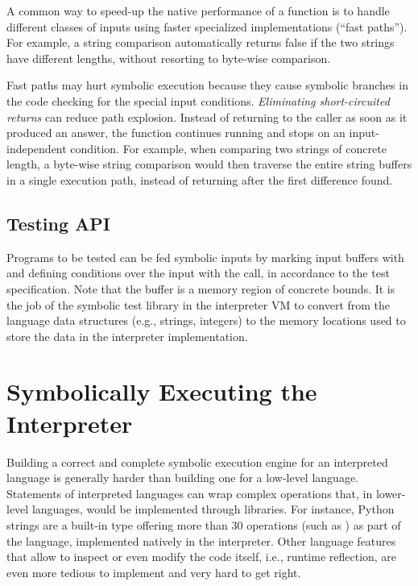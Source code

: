 A common way to speed-up the native performance of a function is to handle different classes of inputs using faster specialized implementations (``fast paths'').  For example, a string comparison automatically returns false if the two strings have different lengths, without resorting to byte-wise comparison.

Fast paths may hurt symbolic execution because they cause symbolic branches in the code checking for the special input conditions.  \emph{Eliminating short-circuited returns} can reduce path explosion.  Instead of returning to the caller as soon as it produced an answer, the function continues running and stops on an input-independent condition.  For example, when comparing two strings of concrete length, a byte-wise string comparison would then traverse the entire string buffers in a single execution path, instead of returning after the first difference found.

\subsection{Testing API}
\label{sec:chef:testingAPI}

Programs to be tested can be fed symbolic inputs by marking input buffers with  and defining conditions over the input with the  call, in accordance to the test specification.  Note that the buffer is a memory region of concrete bounds.  It is the job of the symbolic test library in the interpreter VM to convert from the language data structures (e.g., strings, integers) to the memory locations used to store the data in the interpreter implementation.



\iffalse
\section{Symbolically Executing the Interpreter}

Building a correct and complete symbolic execution engine for an interpreted language is generally harder than building one for a low-level language. 
%
Statements of interpreted languages can wrap complex operations that, in lower-level languages, would be implemented through libraries. For instance, Python strings are a built-in type offering more than 30 operations (such as ) as part of the language, implemented natively in the interpreter. 
%
Other language features that allow to inspect or even modify the code itself, i.e., runtime reflection, are even more tedious to implement and very hard to get right.

